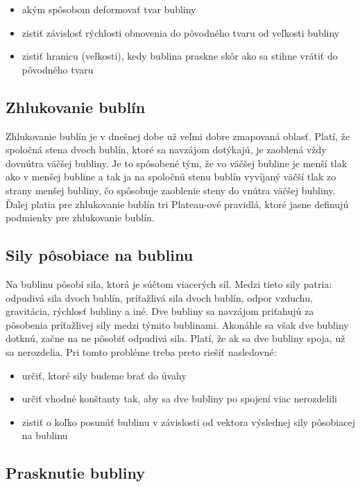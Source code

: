 \begin{itemize}
\item akým spôsobom deformovať tvar bubliny
\item zistiť závislosť rýchlosti obnovenia do pôvodného tvaru od veľkosti bubliny
\item zistiť hranicu (veľkosti), kedy bublina praskne skôr ako sa stihne vrátiť do pôvodného tvaru
\end{itemize}  

\subsection{Zhlukovanie bublín}

Zhlukovanie bublín je v dnešnej dobe už veľmi dobre zmapovaná oblasť. Platí, že spoločná stena dvoch bublín, ktoré sa navzájom dotýkajú, je zaoblená vždy dovnútra väčšej bubliny. Je to spôsobené tým, že vo väčšej bubline je menší tlak ako v menšej bubline a tak ja na spoločnú stenu bublín vyvíjaný väčší tlak zo strany menšej bubliny, čo spôsobuje zaoblenie steny do vnútra väčšej bubliny. Ďalej platia pre zhlukovanie bublín tri Plateau-ové pravidlá, ktoré jasne definujú podmienky pre zhlukovanie bublín.

\subsection{Sily pôsobiace na bublinu}

Na bublinu pôsobí sila, ktorá je súčtom viacerých síl. Medzi tieto sily patria: odpudivá sila dvoch bublín, príťažlivá sila dvoch bublín, odpor vzduchu, gravitácia, rýchlosť bubliny a iné. Dve bubliny sa navzájom priťahujú za pôsobenia príťažlivej sily medzi týmito bublinami. Akonáhle sa však dve bubliny dotknú, začne na ne pôsobiť odpudivá sila. Platí, že ak sa dve bubliny spoja, už sa nerozdelia. Pri tomto probléme treba preto riešiť nasledovné:

\begin{itemize}
\item určiť, ktoré sily budeme brať do úvahy
\item určiť vhodné konštanty tak, aby sa dve bubliny po spojení viac nerozdelili
\item zistiť o koľko posunúť bublinu v závislosti od vektora výslednej sily pôsobiacej na bublinu
\end{itemize}  

\subsection{Prasknutie bubliny}

